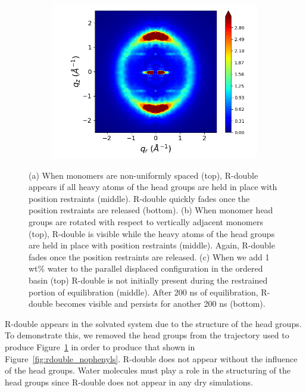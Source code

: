 \documentclass[journal=jpcbfk,manuscript=article]{achemso}
\begin{document}
\begin{figure}[!htb]
\begin{subfigure}{0.3\linewidth}
  \end{subfigure}
  \begin{subfigure}{0.3\linewidth}
  	\centering
  	\includegraphics[width=\textwidth]{solvated_offset_rzplot_1.png}
  	\caption{}\label{fig:solvated_pore_rzplot_norestraints}
  \end{subfigure}
  \caption{(a) When monomers are non-uniformly spaced (top), R-double appears if all heavy atoms
  of the head groups are held in place with position restraints (middle). R-double quickly fades once 
  the position restraints are released (bottom). (b) When monomer head groups are rotated with respect
  to vertically adjacent monomers (top), R-double is visible while the heavy atoms of the head groups
  are held in place with position restraints (middle). Again, R-double fades once the position 
  restraints are released. (c) When we add 1 wt\% water to the parallel displaced configuration in the
  ordered basin (top) R-double is not initially present during the restrained portion of equilibration (middle).
  After 200 ns of equilibration, R-double becomes visible and persists for another 200 ns (bottom).}\label{fig:rdouble}
  \end{figure}

  R-double appears in the solvated system due to the structure of the head
  groups. To demonstrate this, we removed the head groups from the trajectory
  used to produce Figure~\ref{fig:solvated_pore_rzplot_norestraints} in order to
  produce that shown in Figure~\ref{fig:rdouble_nophenyls}. R-double does not
  appear without the influence of the head groups. Water molecules must play a
  role in the structuring of the head groups since R-double does not appear in
  any dry simulations.
\end{document}
